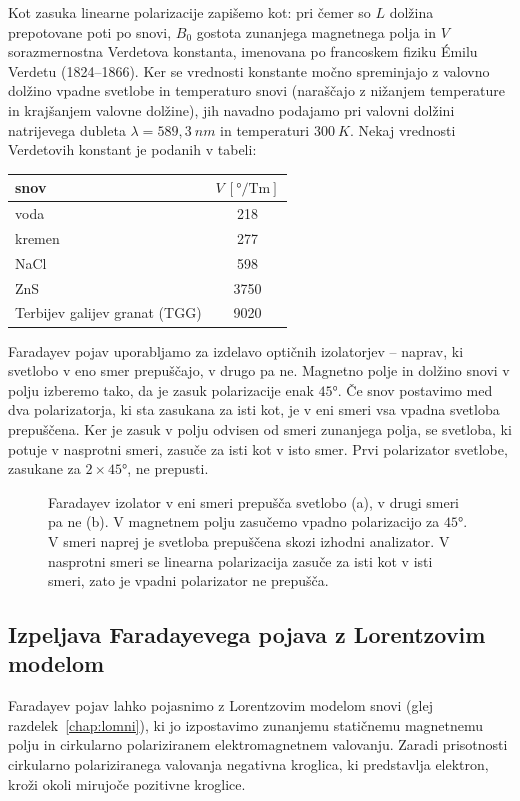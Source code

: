 Kot zasuka linearne polarizacije zapišemo kot:
pri čemer so $L$ dolžina prepotovane poti po snovi, $B_0$ gostota zunanjega 
magnetnega polja in $V$ sorazmernostna Verdetova konstanta, imenovana po francoskem 
fiziku \'{E}milu Verdetu (1824--1866). Ker se vrednosti konstante močno 
spreminjajo z valovno dolžino vpadne svetlobe in temperaturo snovi 
(naraščajo z nižanjem temperature in krajšanjem valovne dolžine), jih navadno
podajamo pri valovni dolžini natrijevega dubleta $\lambda = 589,3~\si{nm}$ in 
temperaturi $300~\si{K}$.
Nekaj vrednosti Verdetovih konstant je podanih v tabeli:

\begin{center}
\begin{tabular}{|l|c|}
\hline
snov& $V~[\si{\degree/\tesla\metre}]$\\ \hline 
voda & 218\\ \hline
kremen & 277 \\ \hline
NaCl& 598 \\ \hline
ZnS & 3750 \\ \hline
Terbijev galijev granat (TGG) & 9020 \\\hline
\end{tabular}
\end{center}

Faradayev pojav uporabljamo za izdelavo optičnih izolatorjev -- naprav, ki svetlobo
v eno smer prepuščajo, v drugo pa ne. Magnetno polje in dolžino snovi v polju izberemo
tako, da je zasuk polarizacije enak $45\si{\degree}$. Če snov postavimo med dva 
polarizatorja, ki sta zasukana za isti kot, je v eni smeri vsa vpadna svetloba prepuščena.
Ker je zasuk v polju odvisen od smeri zunanjega polja, se svetloba, ki potuje v 
nasprotni smeri, zasuče za isti kot v isto smer. Prvi polarizator svetlobe, zasukane
za $2\times 45\si{\degree}$, ne prepusti. 

\begin{figure}[h]
\centering
\def\svgwidth{140truemm} 

\caption{Faradayev izolator v eni smeri prepušča svetlobo (a), v drugi smeri pa ne (b).
V magnetnem polju zasučemo vpadno polarizacijo za $45\si{\degree}$. V smeri naprej je
svetloba prepuščena skozi izhodni analizator. V nasprotni smeri se linearna polarizacija
zasuče za isti kot v isti smeri, zato je vpadni polarizator ne prepušča.}
\label{fig:09_izolator}
\end{figure}

\subsection*{Izpeljava Faradayevega pojava z Lorentzovim modelom}
Faradayev pojav lahko pojasnimo z Lorentzovim modelom snovi 
(glej razdelek~\ref{chap:lomni}), ki jo izpostavimo zunanjemu 
statičnemu magnetnemu polju in cirkularno polariziranem
elektromagnetnem valovanju. Zaradi prisotnosti cirkularno 
polariziranega valovanja negativna kroglica, ki predstavlja elektron, 
kroži okoli mirujoče pozitivne kroglice. 

